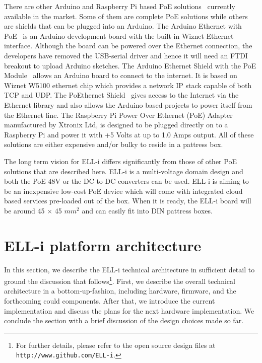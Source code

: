 \documentclass[final]{siamltex}
\begin{document}
There are other Arduino and Raspberry Pi based PoE
solutions~\cite{ArduinoEthernetPOE} \cite{ArduinoEthernetShieldPOE}
\cite{POEthernetShield} \cite{etherduino} \cite{xtronix} currently available in
the market. Some of them are complete PoE solutions while others are shields
that can be plugged into an Arduino. The Arduino Ethernet with
PoE~\cite{ArduinoEthernetPOE} is an Arduino development board with the built in
Wiznet Ethernet interface. Although the board can be powered over the Ethernet
connection, the developers have removed the USB-serial driver and hence it will
need an FTDI breakout to upload Arduino sketches. The Arduino Ethernet Shield
with the PoE Module~\cite{ArduinoEthernetShieldPOE} allows an Arduino board to
connect to the internet. It is based on Wiznet W5100 ethernet chip which
provides a network IP stack capable of both TCP and UDP. The PoEthernet
Shield~\cite{POEthernetShield} gives access to the Internet via the Ethernet
library and also allows the Arduino based projects to power itself from the
Ethernet line. The Raspberry Pi Power Over Ethernet (PoE) Adapter~\cite{xtronix}
manufactured by Xtronix Ltd, is designed to be plugged directly on to a
Raspberry Pi and power it with +5 Volts at up to 1.0 Amps output. All of these
solutions are either expensive and/or bulky to reside in a pattress box.

The long term vision for ELL-i differs significantly from those of other PoE
solutions that are described here. ELL-i is a multi-voltage domain design and
both the PoE 48V or the DC-to-DC converters can be used. ELL-i is aiming to be
an inexpensive low-cost PoE device which will come with integrated cloud based
services pre-loaded out of the box. When it is ready, the ELL-i board will be
around 45 $\times$ 45 $mm^2$ and can easily fit into DIN pattress boxes. 



\section{ELL-i platform architecture}
\label{sec:architecture}

In this section, we describe the ELL-i technical architecture in
sufficient detail to ground the discussion that follows\footnote{For further
details, please refer to the open source design files at
\hbox{\tt http://www.github.com/ELL-i}.}.
First, we describe the overall technical architecture in a
bottom-up-fashion, including hardware, firmware, and the forthcoming
could components.  After that, we introduce the current
implementation and discuss the plans for the next hardware implementation.  We
conclude the section with a brief discussion of the design choices
made so far.
\end{document}
